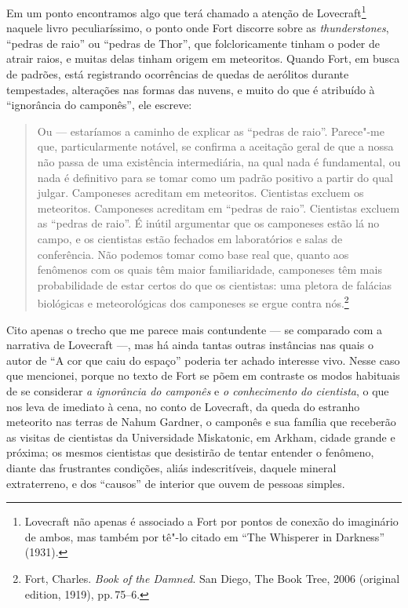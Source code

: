 Em um ponto encontramos algo que terá chamado a atenção de
Lovecraft\footnote{Lovecraft não apenas é associado a Fort por pontos de
  conexão do imaginário de ambos, mas também por tê"-lo citado em ``The
  Whisperer in Darkness'' (1931).} naquele livro peculiaríssimo, o ponto
onde Fort discorre sobre as \emph{thunderstones}, ``pedras de raio'' ou
``pedras de Thor'', que folcloricamente tinham o poder de atrair raios,
e muitas delas tinham origem em meteoritos. Quando Fort, em busca de
padrões, está registrando ocorrências de quedas de aerólitos durante
tempestades, alterações nas formas das nuvens, e muito do que é
atribuído à ``ignorância do camponês'', ele escreve:

\begin{quote}
Ou --- estaríamos a caminho de explicar as ``pedras de raio''. Parece"-me
que, particularmente notável, se confirma a aceitação geral de que a
nossa não passa de uma existência intermediária, na qual nada é
fundamental, ou nada é definitivo para se tomar como um padrão positivo
a partir do qual julgar. Camponeses acreditam em meteoritos. Cientistas
excluem os meteoritos. Camponeses acreditam em ``pedras de raio''.
Cientistas excluem as ``pedras de raio''. É inútil argumentar que os
camponeses estão lá no campo, e os cientistas estão fechados em
laboratórios e salas de conferência. Não podemos tomar como base real
que, quanto aos fenômenos com os quais têm maior familiaridade,
camponeses têm mais probabilidade de estar certos do que os cientistas:
uma pletora de falácias biológicas e meteorológicas dos camponeses se
ergue contra nós.\footnote{Fort, Charles. \emph{Book of the Damned}. San
  Diego, The Book Tree, 2006 (original edition, 1919), pp.\,75--6.}
\end{quote}

Cito apenas o trecho que me parece mais contundente --- se comparado com
a narrativa de Lovecraft ---, mas há ainda tantas outras instâncias nas
quais o autor de ``A cor que caiu do espaço'' poderia ter achado
interesse vivo. Nesse caso que mencionei, porque no texto de Fort se
põem em contraste os modos habituais de se considerar \emph{a ignorância
do camponês} e \emph{o conhecimento do cientista}, o que nos leva de
imediato à cena, no conto de Lovecraft, da queda do estranho meteorito
nas terras de Nahum Gardner, o camponês e sua família que receberão as
visitas de cientistas da Universidade Miskatonic, em Arkham, cidade
grande e próxima; os mesmos cientistas que desistirão de tentar entender
o fenômeno, diante das frustrantes condições, aliás indescritíveis,
daquele mineral extraterreno, e dos ``causos'' de interior que ouvem de
pessoas simples.

